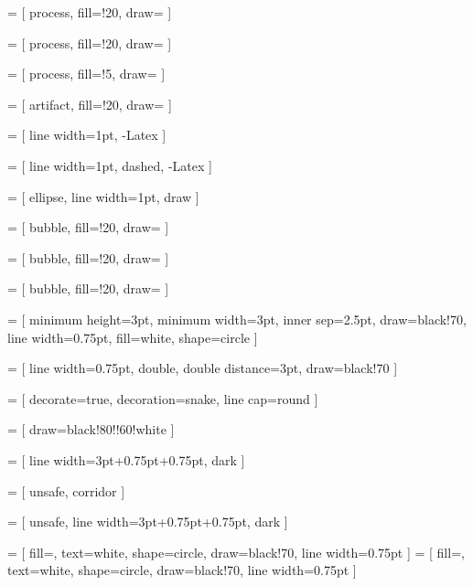  = [
    process,
    fill=\greenColor!20,
    draw=\greenColor
]

 = [
    process,
    fill=\blueColor!20,
    draw=\blueColor
]

 = [
    process,
    fill=\purpleColor!5,
    draw=\purpleColor
]

 = [
    artifact,
    fill=\blueColor!20,
    draw=\blueColor
]

 = [
    line width=1pt,
    -Latex
]

 = [
    line width=1pt,
    dashed,
    -Latex
]

 = [
    ellipse,
    line width=1pt,
    draw
]

 = [
    bubble,
    fill=\purpleColor!20,
    draw=\purpleColor
]

 = [
    bubble,
    fill=\greenColor!20,
    draw=\greenColor
]

 = [
bubble,
fill=\blueColor!20,
draw=\blueColor
]

\newcommand{\gridNodeSize}{3pt}
\newcommand{\gridNodeLine}{0.75pt}	%
\newcommand{\gridNodeSizePlus}{\gridNodeSize+\gridNodeLine+\gridNodeLine}

 = [
    minimum height=\gridNodeSize,
    minimum width=\gridNodeSize,
    inner sep=2.5pt,
    draw=black!70,
    line width=\gridNodeLine,
    fill=white,
    shape=circle
]

 = [
    line width=\gridNodeLine,
    double,
    double distance=\gridNodeSize,
    draw=black!70
]


 = [
    decorate=true,
    decoration=snake,
    line cap=round
]

 = [
    draw=black!80!\blueColor!60!white
]

 = [
    line width=\gridNodeSizePlus,
    dark
]

 = [
    unsafe,
    corridor
]

 = [
    unsafe,
    line width=\gridNodeSizePlus,
    dark
]

 = [
    fill=\greenColor,
    text=white,
    shape=circle,
    draw=black!70,
    line width=\gridNodeLine
]
 = [
    fill=\greenColor,
    text=white,
    shape=circle,
    draw=black!70,
    line width=\gridNodeLine
]

